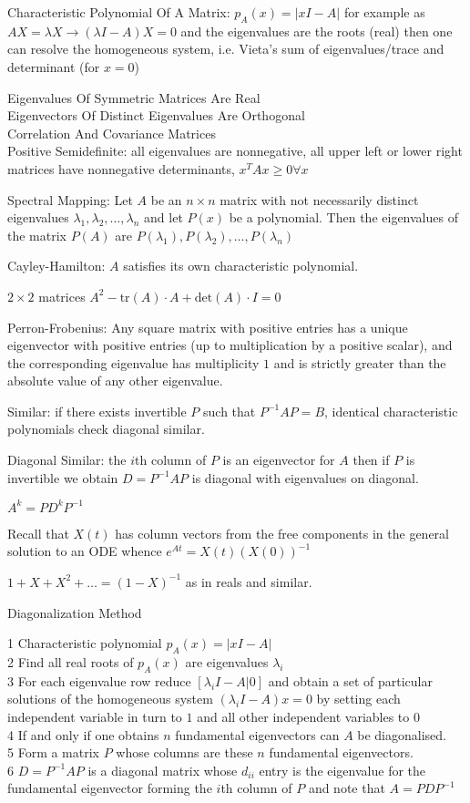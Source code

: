 Characteristic Polynomial Of A Matrix: $p_A (x)=|xI - A|$ for example as $AX=\lambda X \to (\lambda I - A)X=0$ and the eigenvalues are the roots (real) then one can resolve the homogeneous system, i.e. Vieta's sum of eigenvalues/trace and determinant (for $x=0$)

Eigenvalues Of Symmetric Matrices Are Real \\
Eigenvectors Of Distinct Eigenvalues Are Orthogonal \\
Correlation And Covariance Matrices \\

Positive Semidefinite: all eigenvalues are nonnegative, all upper left or lower right matrices have nonnegative determinants, $x^TAx\ge 0 \forall x$

Spectral Mapping: Let $A$ be an $n \times n$ matrix with not necessarily distinct eigenvalues $\lambda_1, \lambda_2, \dots, \lambda_n$ and let $P(x)$ be a polynomial. Then the eigenvalues of the matrix $P(A)$ are $P(\lambda_1), P(\lambda_2), \dots, P(\lambda_n)$

Cayley-Hamilton: $A$ satisfies its own characteristic polynomial.

$2 \times 2$ matrices $A^2-\text{tr}(A) \cdot A+\text{det}(A) \cdot I = 0$

Perron-Frobenius: Any square matrix with positive entries has a unique eigenvector with positive entries (up to multiplication by a positive scalar), and the corresponding eigenvalue has multiplicity $1$ and is strictly greater than the absolute value of any other eigenvalue.

Similar: if there exists invertible $P$ such that $P^{-1} A P=B$, identical characteristic polynomials check diagonal similar.

Diagonal Similar: the $i$th column of $P$ is an eigenvector for $A$ then if $P$ is invertible we obtain $D=P^{-1} A P$ is diagonal with eigenvalues on diagonal.

$A^k=P D^k P^{-1}$

Recall that $X(t)$ has column vectors from the free components in the general solution to an ODE whence $e^{At}=X(t)(X(0))^{-1}$

$1+X+X^2+\dots =(1-X)^{-1}$ as in reals and similar.

Diagonalization Method

1 Characteristic polynomial $p_A (x) = |xI-A|$ \\
2 Find all real roots of $p_A (x)$ are eigenvalues $\lambda_i$ \\
3 For each eigenvalue row reduce $[\lambda_i I - A | 0]$ and obtain a set of particular solutions of the homogeneous system $(\lambda_i I -A)x = 0$ by setting each independent variable in turn to $1$ and all other independent variables to $0$ \\
4 If and only if one obtains $n$ fundamental eigenvectors can $A$ be diagonalised. \\
5 Form a matrix $P$ whose columns are these $n$ fundamental eigenvectors. \\
6 $D=P^{-1}AP$ is a diagonal matrix whose $d_{ii}$ entry is the eigenvalue for the fundamental eigenvector forming the $i$th column of $P$ and note that $A=PDP^{-1}$


